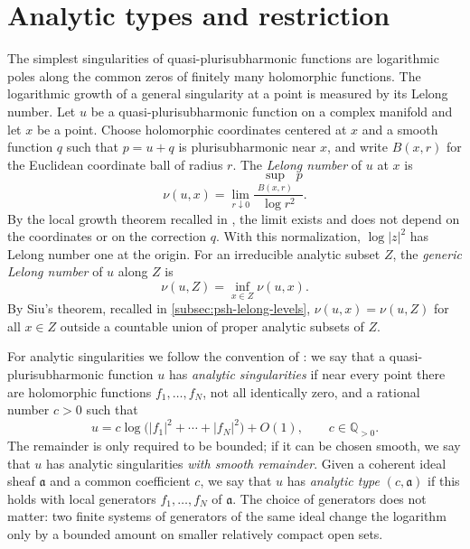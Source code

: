 \section{Analytic types and restriction}\label{sec:analytic-types}

The simplest singularities of quasi-plurisubharmonic functions are logarithmic poles along the common zeros of finitely many holomorphic functions. The logarithmic growth of a general singularity at a point is measured by its Lelong number. Let $u$ be a quasi-plurisubharmonic function on a complex manifold and let $x$ be a point. Choose holomorphic coordinates centered at $x$ and a smooth function $q$ such that $p=u+q$ is plurisubharmonic near $x$, and write $B(x,r)$ for the Euclidean coordinate ball of radius $r$. The \emph{Lelong number} of $u$ at $x$ is
\[
 \nu(u,x)=\lim_{r\downarrow0}
       \frac{\sup_{B(x,r)}p}{\log r^2}.
\]
By the local growth theorem recalled in \cite{SGPT}, the limit exists and does not depend on the coordinates or on the correction $q$. With this normalization, $\log|z|^2$ has Lelong number one at the origin. For an irreducible analytic subset $Z$, the \emph{generic Lelong number} of $u$ along $Z$ is
\[
 \nu(u,Z)=\inf_{x\in Z}\nu(u,x).
\]
By Siu's theorem, recalled in \cref{subsec:psh-lelong-levels}, $\nu(u,x)=\nu(u,Z)$ for all $x\in Z$ outside a countable union of proper analytic subsets of $Z$.

For analytic singularities we follow the convention of \cite{SGPT}: we say that a quasi-plurisubharmonic function $u$ has \emph{analytic singularities} if near every point there are holomorphic functions $f_1,\ldots,f_N$, not all identically zero, and a rational number $c>0$ such that
\[
 u=c\log\bigl(|f_1|^2+\cdots+|f_N|^2\bigr)+O(1),
 \qquad c\in\mathbb Q_{>0}.
\]
The remainder is only required to be bounded; if it can be chosen smooth, we say that $u$ has analytic singularities \emph{with smooth remainder}. Given a coherent ideal sheaf $\mathfrak a$ and a common coefficient $c$, we say that $u$ has \emph{analytic type} $(c,\mathfrak a)$ if this holds with local generators $f_1,\ldots,f_N$ of $\mathfrak a$. The choice of generators does not matter: two finite systems of generators of the same ideal change the logarithm only by a bounded amount on smaller relatively compact open sets.

